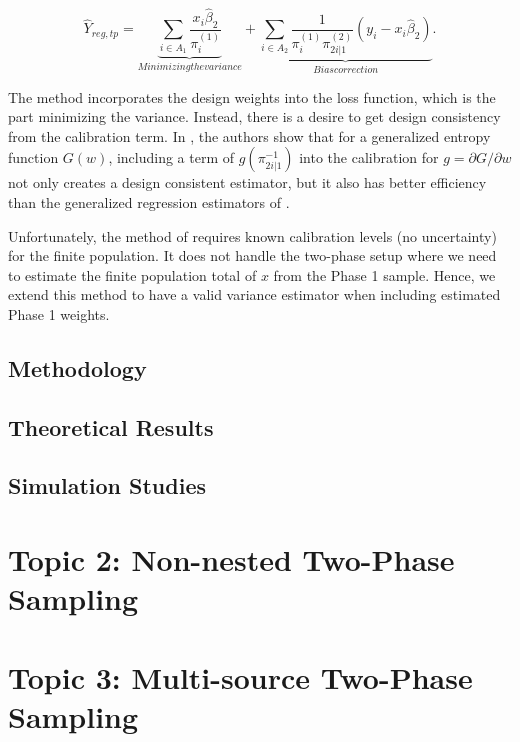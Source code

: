 \documentclass[12pt]{article}
\begin{document}
$$ \hat Y_{reg, tp} 
= \underbrace{\sum_{i \in A_1} \frac{x_i \hat \beta_2}{\pi_i^{(1)}}}_{Minimizing
the variance} + \underbrace{\sum_{i \in A_2}
\frac{1}{\pi_i^{(1)}\pi_{2i|1}^{(2)}} (y_i - x_i \hat \beta_2)}_{Bias
correction}.$$

The \cite{deville1992calibration} method incorporates the design weights into
the loss function, which is the part minimizing the variance. Instead, there is
a desire to get design consistency from the calibration term. In 
\cite{kwon2024debiased}, the authors show that for a generalized entropy
function $G(w)$, including a term of $g(\pi_{2i|1}^{-1})$ into the calibration
for $g = \partial G / \partial w$ not only creates a design consistent
estimator, but it also has better efficiency than the generalized regression
estimators of \cite{deville1992calibration}.

Unfortunately, the method of \cite{kwon2024debiased} requires known calibration
levels (no uncertainty) for the finite population. It does not handle the
two-phase setup where we need to estimate the finite population total of $x$
from the Phase 1 sample. Hence, we extend this method to have a valid variance 
estimator when including estimated Phase 1 weights.

\subsection*{Methodology}


\subsection*{Theoretical Results}


\subsection*{Simulation Studies}


\section*{Topic 2: Non-nested Two-Phase Sampling}

\section*{Topic 3: Multi-source Two-Phase Sampling}

\printbibliography
\end{document}

